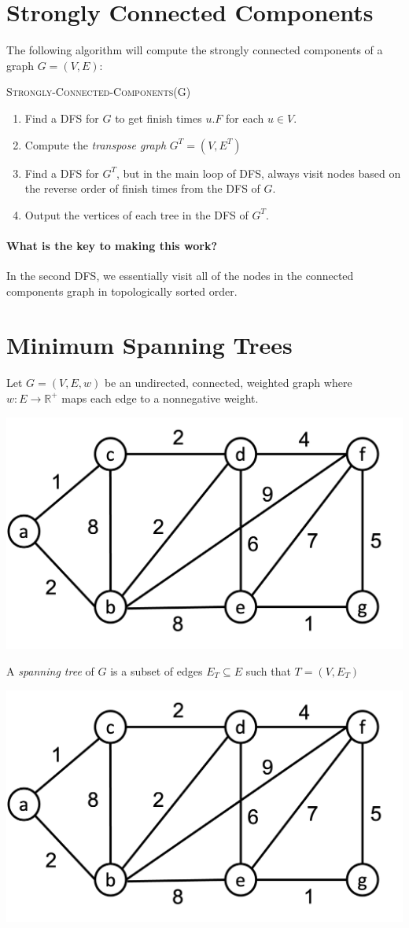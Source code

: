 \documentclass[11  pt]{exam}
\begin{document}
	
	
	\section{Strongly Connected Components}
	The following algorithm will compute the strongly connected components of a graph $G = (V,E)$:
	
	\textsc{Strongly-Connected-Components}(G)
	\begin{enumerate}
		\item Find a DFS for $G$ to get finish times $u.F$ for each $u \in V$.
		\item Compute the \emph{transpose graph} $G^T = (V,E^T)$
		\item Find a DFS for $G^T$, but in the main loop of DFS, always visit nodes based on the reverse order of finish times from the DFS of $G$.
		\item Output the vertices of each tree in the DFS of $G^T$. 
	\end{enumerate}
	\newpage
	\paragraph{What is the key to making this work?}
	In the second DFS, we essentially visit all of the nodes in the connected components graph in topologically sorted order.
	
	
\newpage
	\section{Minimum Spanning Trees}
Let $G = (V,E,w)$ be an undirected, connected, weighted graph where $w \colon E \rightarrow \mathbb{R}^+$ maps each edge to a nonnegative weight.


\begin{center}
	\includegraphics[width = .5\linewidth]{mst-graph.png}
\end{center}

A \emph{spanning tree} of $G$ is a subset of edges $E_T \subseteq E$ such that $T = (V,E_T)$  

\begin{center}
	\includegraphics[width = .5\linewidth]{mst-graph.png}
\end{center}
\end{document}
